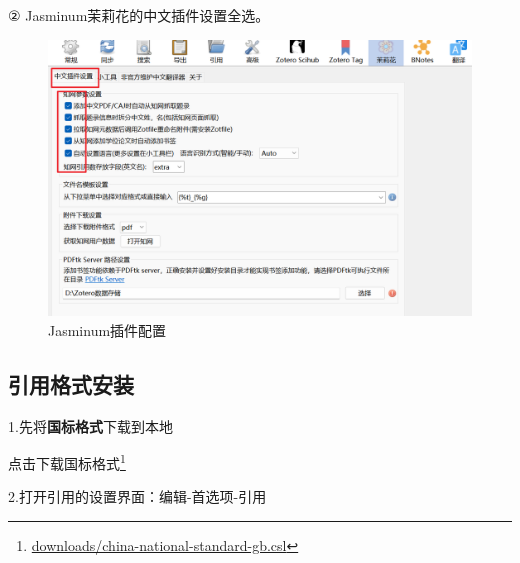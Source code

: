 \documentclass[]{ctexbook}
\renewcommand{\href}[2]{#2\footnote{\url{#1}}}
\theoremstyle{definition}
\theoremstyle{definition}
\theoremstyle{definition}
\theoremstyle{definition}
\theoremstyle{remark}
\begin{document}
② Jasminum茉莉花的中文插件设置全选。

\begin{figure}

{\centering \includegraphics[width=1\linewidth]{img/zotero-cite-cn/plugins_Jasminum_setting} 

}

\caption{Jasminum插件配置}\label{fig:plugins-Jasminum-setting}
\end{figure}

\subsection{引用格式安装}\label{ux5f15ux7528ux683cux5f0fux5b89ux88c5}

1.先将\textbf{国标格式}下载到本地

\href{downloads/china-national-standard-gb.csl}{点击下载国标格式}

2.打开引用的设置界面：编辑-首选项-引用
\end{document}
